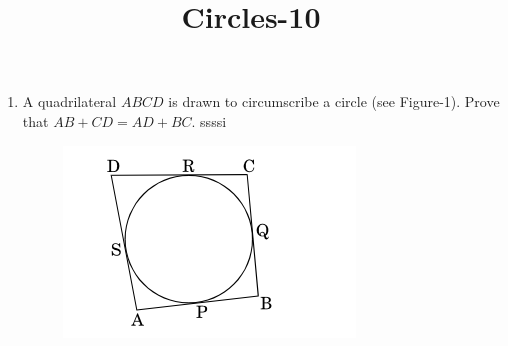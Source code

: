 \documentclass{article}
\begin{document}
\title{Circles-10}
\begin{enumerate}
	\item A quadrilateral $ABCD$ is drawn to circumscribe a circle (see Figure-1). Prove that $AB + CD = AD + BC$.
ssssi	\begin{figure}[!htb]
		\centering
			\includegraphics[width=\columnwidth]{figs/circ-1.png}
		

\end{figure}
\end{enumerate}
\end{document}
